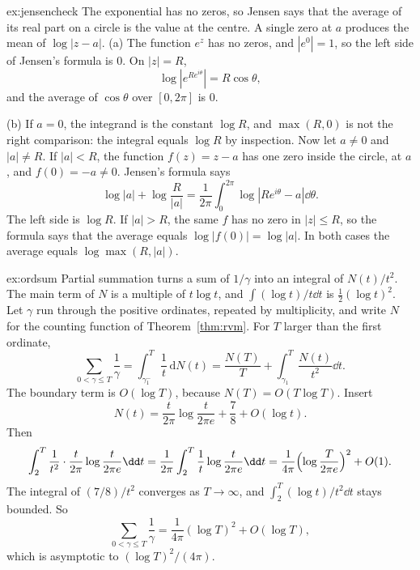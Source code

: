 \begin{solution}{ex:jensencheck}
\idea The exponential has no zeros, so Jensen says that the average of its real part on a circle is the value at the centre. A single zero at $a$ produces the mean of $\log|z-a|$.
\writeup (a) The function $e^z$ has no zeros, and $|e^0|=1$, so the left side of Jensen's formula is $0$. On $|z|=R$,
\[
\log|e^{Re^{i\theta}}|=R\cos\theta,
\]
and the average of $\cos\theta$ over $[0,2\pi]$ is $0$.

(b) If $a=0$, the integrand is the constant $\log R$, and $\max(R,0)$ is not the right comparison: the integral equals $\log R$ by inspection. Now let $a\ne0$ and $|a|\ne R$. If $|a|<R$, the function $f(z)=z-a$ has one zero inside the circle, at $a$, and $f(0)=-a\ne0$. Jensen's formula says
\[
\log|a|+\log\frac R{|a|}=\frac1{2\pi}\int_0^{2\pi}\log|Re^{i\theta}-a|\dd\theta.
\]
The left side is $\log R$. If $|a|>R$, the same $f$ has no zero in $|z|\le R$, so the formula says that the average equals $\log|f(0)|=\log|a|$. In both cases the average equals $\log\max(R,|a|)$.
\end{solution}

\begin{solution}{ex:ordsum}
\idea Partial summation turns a sum of $1/\gamma$ into an integral of $N(t)/t^2$. The main term of $N$ is a multiple of $t\log t$, and $\int(\log t)/t\dd t$ is $\frac12(\log t)^2$.
\writeup Let $\gamma$ run through the positive ordinates, repeated by multiplicity, and write $N$ for the counting function of Theorem~\ref{thm:rvm}. For $T$ larger than the first ordinate,
\[
\sum_{0<\gamma\le T}\frac1\gamma=\int_{\gamma_1^-}^T\frac1t\,\mathrm dN(t)=\frac{N(T)}T+\int_{\gamma_1}^T\frac{N(t)}{t^2}\dd t.
\]
The boundary term is $O(\log T)$, because $N(T)=O(T\log T)$. Insert
\[
N(t)=\frac t{2\pi}\log\frac t{2\pi e}+\frac78+O(\log t).
\]
Then
\[
\int_2^T\frac1{t^2}\cdot\frac t{2\pi}\log\frac t{2\pi e}\dd t=\frac1{2\pi}\int_2^T\frac1t\log\frac t{2\pi e}\dd t=\frac1{4\pi}\Bigl(\log\frac T{2\pi e}\Bigr)^2+O(1).
\]
The integral of $(7/8)/t^2$ converges as $T\to\infty$, and $\int_2^T(\log t)/t^2\dd t$ stays bounded. So
\[
\sum_{0<\gamma\le T}\frac1\gamma=\frac1{4\pi}(\log T)^2+O(\log T),
\]
which is asymptotic to $(\log T)^2/(4\pi)$.
\end{solution}

